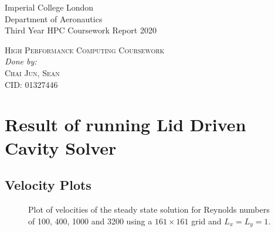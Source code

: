 \documentclass[11pt]{article}
\begin{document}
	\begin{titlepage}
	\begin{flushleft}
	Imperial College London \\
	Department of Aeronautics \\
	Third Year HPC Coursework Report 2020 \\
	\end{flushleft}
	\vspace*{\fill}	
	\begin{center}
		\textsc{\Huge High Performance Computing Coursework} \\
		\vspace{11pt}
		\textit{\small Done by:} \\
		\textsc{\Large Chai Jun, Sean} \\
		\textsc{CID: 01327446} \\ 
		\vspace*{\fill}
	\end{center}
		
	\end{titlepage}
	
	\tableofcontents
	\newpage
	
	\section{Result of running Lid Driven Cavity Solver}
	\subsection{Velocity Plots}
	\begin{figure}[htp]
            \centering
            \hfill
            \caption{Plot of velocities of the steady state solution for Reynolds numbers of 100, 400, 1000 and 3200 using a $161 \times 161$ grid and $L_x = L_y = 1$.}
            \label{fig:velocities}
        \end{figure}
	
\end{document}
